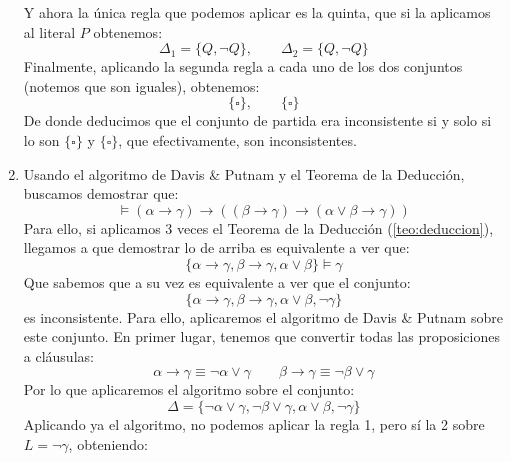 \begin{ejemplo}
\begin{enumerate}
            Y ahora la única regla que podemos aplicar es la quinta, que si la aplicamos al literal $P$ obtenemos:
            \begin{equation*}
                \Delta_1 = \{Q, \lnot Q\}, \qquad \Delta_2 = \{Q, \lnot Q\}
            \end{equation*}
            Finalmente, aplicando la segunda regla a cada uno de los dos conjuntos (notemos que son iguales), obtenemos:
            \begin{equation*}
                \{\square\}, \qquad \{\square\}
            \end{equation*}
            De donde deducimos que el conjunto de partida era inconsistente si y solo si lo son $\{\square\}$ y $\{\square\}$, que efectivamente, son inconsistentes.
        \item Usando el algoritmo de Davis \& Putnam y el Teorema de la Deducción, buscamos demostrar que:
            \begin{equation*}
                \vDash (\alpha\to\gamma)\to ((\beta\to\gamma)\to(\alpha\lor\beta\to\gamma))
            \end{equation*}
            Para ello, si aplicamos 3 veces el Teorema de la Deducción (\ref{teo:deduccion}), llegamos a que demostrar lo de arriba es equivalente a ver que:
            \begin{equation*}
                \{\alpha\to\gamma, \beta\to\gamma,\alpha\lor\beta\}\vDash \gamma
            \end{equation*}
            Que sabemos que a su vez es equivalente a ver que el conjunto:
            \begin{equation*}
                \{\alpha\to\gamma, \beta\to\gamma,\alpha\lor\beta,\lnot\gamma\}
            \end{equation*}
            es inconsistente. Para ello, aplicaremos el algoritmo de Davis \& Putnam sobre este conjunto. En primer lugar, tenemos que convertir todas las proposiciones a cláusulas:
            \begin{equation*}
                \alpha\to\gamma\equiv \lnot\alpha\lor \gamma \qquad \beta\to\gamma\equiv \lnot\beta\lor \gamma
            \end{equation*}
            Por lo que aplicaremos el algoritmo sobre el conjunto:
            \begin{equation*}
                \Delta = \{\lnot\alpha\lor\gamma,\lnot\beta\lor\gamma,\alpha\lor\beta,\lnot\gamma\}
            \end{equation*}
            Aplicando ya el algoritmo, no podemos aplicar la regla 1, pero sí la 2 sobre $L=\lnot\gamma$, obteniendo:

\end{enumerate}
\end{ejemplo}
